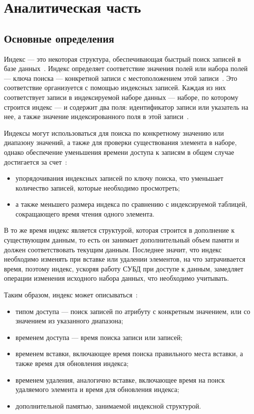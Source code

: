 \chapter{Аналитическая часть\label{analysis}}

\section{Основные определения}

Индекс --- это некоторая структура, обеспечивающая быстрый поиск записей в базе
данных~\cite{amur}. Индекс определяет соответствие значения полей или набора
полей --- ключа поиска --- конкретной записи с местоположением этой
записи~\cite{ship}. Это соответствие организуется с помощью индексных записей.
Каждая из них соответствует записи в индексируемой наборе данных --- наборе, по
которому строится индекс --- и содержит два поля: идентификатор записи или
указатель на нее, а также значение индексированного поля в этой
записи~\cite{syore}.

Индексы могут использоваться для поиска по конкретному значению или диапазону
значений, а также для проверки существования элемента в наборе, однако
обеспечение уменьшения времени доступа к записям в общем случае достигается за
счет~\cite{ship}:
\begin{itemize}
    \item упорядочивания индексных записей по ключу поиска, что уменьшает
        количество записей, которые необходимо просмотреть;
    \item а также меньшего размера индекса по сравнению с индексируемой
        таблицей, сокращающего время чтения одного элемента.
\end{itemize}

В то же время индекс является структурой, которая строится в дополнение к
существующим данным, то есть он занимает дополнительный объем памяти и должен
соответствовать текущим данным.  Последнее значит, что индекс необходимо
изменять при вставке или удалении элементов, на что затрачивается время, поэтому
индекс, ускоряя работу СУБД при доступе к данным, замедляет операции изменения
исходного набора данных, что необходимо учитывать\cite{osip}.

Таким образом, индекс может описываться~\cite{ship}:
\begin{itemize}
    \item типом доступа --- поиск записей по атрибуту с конкретным
        значением, или со значением из указанного диапазона;
    \item временем доступа --- время поиска записи или записей;
    \item временем вставки, включающее время поиска правильного места
        вставки, а также время для обновления индекса;
    \item временем удаления, аналогично вставке, включающее время на поиск
        удаляемого элемента и время для обновления индекса;
    \item дополнительной памятью, занимаемой индексной структурой.
\end{itemize}

